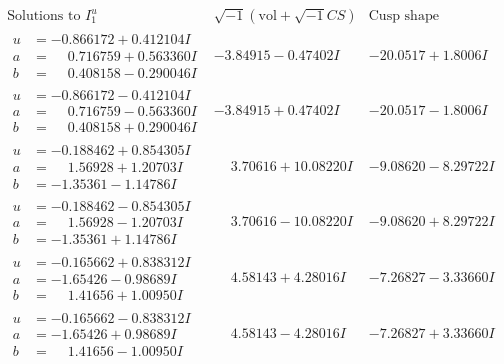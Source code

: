 \documentclass[1p]{elsarticle_modified}
\theoremstyle{definition}
\newcommand{\I}{\sqrt{-1}}
\begin{document}
$$\begin{array}{c|c|c}  
\text{Solutions to }I^u_{1}& \I (\text{vol} + \sqrt{-1}CS) & \text{Cusp shape}\\
 \hline 
\begin{aligned}
u &= -0.866172 + 0.412104 I \\
a &= \phantom{-}0.716759 + 0.563360 I \\
b &= \phantom{-}0.408158 - 0.290046 I\end{aligned}
 & -3.84915 - 0.47402 I & -20.0517 + 1.8006 I \\ \hline\begin{aligned}
u &= -0.866172 - 0.412104 I \\
a &= \phantom{-}0.716759 - 0.563360 I \\
b &= \phantom{-}0.408158 + 0.290046 I\end{aligned}
 & -3.84915 + 0.47402 I & -20.0517 - 1.8006 I \\ \hline\begin{aligned}
u &= -0.188462 + 0.854305 I \\
a &= \phantom{-}1.56928 + 1.20703 I \\
b &= -1.35361 - 1.14786 I\end{aligned}
 & \phantom{-}3.70616 + 10.08220 I & -9.08620 - 8.29722 I \\ \hline\begin{aligned}
u &= -0.188462 - 0.854305 I \\
a &= \phantom{-}1.56928 - 1.20703 I \\
b &= -1.35361 + 1.14786 I\end{aligned}
 & \phantom{-}3.70616 - 10.08220 I & -9.08620 + 8.29722 I \\ \hline\begin{aligned}
u &= -0.165662 + 0.838312 I \\
a &= -1.65426 - 0.98689 I \\
b &= \phantom{-}1.41656 + 1.00950 I\end{aligned}
 & \phantom{-}4.58143 + 4.28016 I & -7.26827 - 3.33660 I \\ \hline\begin{aligned}
u &= -0.165662 - 0.838312 I \\
a &= -1.65426 + 0.98689 I \\
b &= \phantom{-}1.41656 - 1.00950 I\end{aligned}
 & \phantom{-}4.58143 - 4.28016 I & -7.26827 + 3.33660 I \\ \hline\begin{aligned}

\end{aligned}
\end{array}$$
\end{document}

